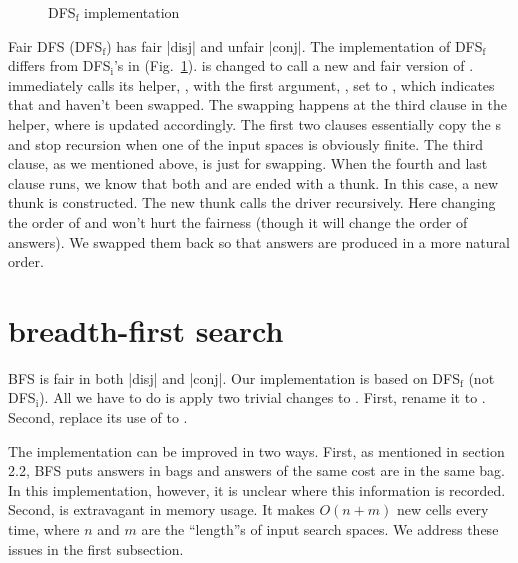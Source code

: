 \documentclass[format=acmlarge, review=true, authordraft=true]{acmart}
\begin{document}
\begin{figure}
	\caption{DFS$_\textrm{f}$ implementation}
	\label{fDFS}
\end{figure}

Fair DFS (DFS$_\textrm{f}$) has fair \scheme|disj| and unfair \scheme|conj|. The implementation of DFS$_\textrm{f}$ 
differs from DFS$_\textrm{i}$'s in  (Fig.~\ref{fDFS}).  is 
changed to call a new and fair version of . 
 immediately calls its helper, 
, with the first argument, , set to 
, which indicates that  and  haven't 
been swapped. The swapping happens at the third  clause in the 
helper, where  is updated accordingly. The first two  
clauses essentially copy the s and stop recursion when one of the 
input spaces is obviously finite. The third clause, as we mentioned above, is 
just for swapping. When the fourth and last clause runs, we know that both 
 and  are ended with a thunk. In this case, a new 
thunk is constructed. The new thunk calls the driver recursively. Here changing 
the order of  and  won't hurt the fairness (though 
it will change the order of answers). We swapped them back so that answers are 
produced in a more natural order.


\section{breadth-first search}

BFS is fair in both \scheme|disj| and \scheme|conj|. Our implementation is based on 
DFS$_\textrm{f}$ (not DFS$_\textrm{i}$). All we have to do is apply two trivial changes to 
. First, rename it to . 
Second, replace its use of  to . 

The implementation can be improved in two ways. First, as mentioned in 
section 2.2, BFS puts answers in bags and answers of the same cost are in the 
same bag. In this implementation, however, it is unclear where this information 
is recorded. Second, 
 is extravagant in memory usage. It makes 
$O(n+m)$ new  cells every time, where $n$ and $m$ are the 
``length''s of input search spaces. We address these issues in the first 
subsection.
\end{document}
